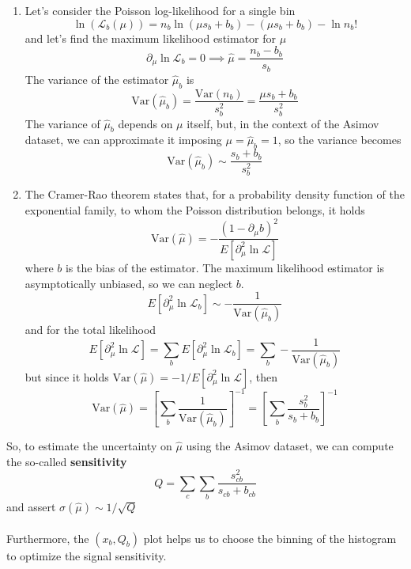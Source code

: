\begin{enumerate}
    \item Let's consider the Poisson log-likelihood for a single bin
\begin{equation}
    \ln\left(\mathcal{L}_b(\mu)\right)=n_b \ln(\mu s_b + b_b) - (\mu s_b + b_b)-\ln n_b! 
\end{equation}
and let's find the maximum likelihood estimator for $\mu$
\begin{equation}
    \partial_\mu \ln{\mathcal{L}_b}=0 \implies \hat{\mu}=\frac{n_b-b_b}{s_b}
\end{equation}
The variance of the estimator $\hat{\mu}_b$ is
\begin{equation}
    {\mathrm{Var}}(\hat{\mu}_b)=\frac{{\mathrm{Var}}(n_b)}{s_b^2}=\frac{\mu s_b + b_b }{s_b^2}
\end{equation}
The variance of $\hat{\mu}_b$ depends on $\mu$ itself, but, in the context of the Asimov dataset, we can approximate it imposing $\mu=\hat{\mu}_b=1$, so the variance becomes
\begin{equation}
    {\mathrm{Var}}(\hat{\mu}_b)\sim \frac{s_b+b_b}{s_b^2}
\end{equation}
\newpage
 \item The Cramer-Rao theorem \cite{James2006StatisticalEdition} states that, for a probability density function of the exponential family, to whom the Poisson distribution belongs, it holds
\begin{equation}
    \mathrm{Var}(\hat{\mu})=-\frac{(1-\partial_\mu b)^2}{E[\partial_\mu^2 \ln \mathcal{L}]}
\end{equation}
where $b$ is the bias of the estimator.
The maximum likelihood estimator is asymptotically unbiased, so we can neglect $b$.
\begin{equation}
    E[\partial_\mu^2 \ln \mathcal{L}_b]\sim-\frac{1}{\mathrm{Var}(\hat{\mu}_b)}
\end{equation}
and for the total likelihood
\begin{equation}
    E[\partial_\mu^2 \ln \mathcal{L}]=
    \sum_b E[\partial_\mu^2 \ln \mathcal{L}_b]=\sum_b
    -\frac{1}{\mathrm{Var}(\hat{\mu}_b)}
\end{equation}
but since it holds $\mathrm{Var}(\hat{\mu}) =-1/E[\partial_\mu^2 \ln \mathcal{L}]$, then
\begin{equation}
    \mathrm{Var}(\hat{\mu})=\left[\sum_b \frac{1}{\mathrm{Var}(\hat{\mu}_b)}\right]^{-1}= \left[\sum_b \frac{s_b^2}{s_b+b_b} \right]^{-1}
\end{equation}
\end{enumerate}
So, to estimate the uncertainty on $\hat{\mu}$ using the Asimov dataset, we can compute the so-called \textbf{sensitivity}
\begin{equation}
    Q=\sum_c \sum_b \frac{s_{cb}^2}{s_{cb}+b_{cb}}
\end{equation}
and assert $\sigma(\hat{\mu}) \sim 1/\sqrt{Q}$\\
\\
Furthermore, the $(x_b,Q_b)$ plot helps us to choose the binning of the histogram to optimize the signal sensitivity.

\newpage
\
\newpage